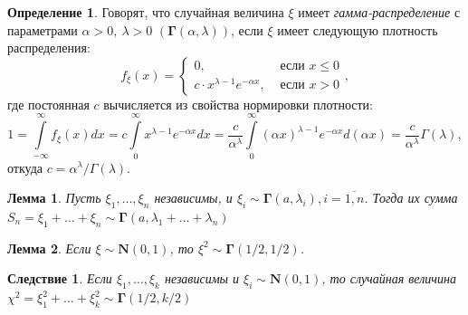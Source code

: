 \documentclass[oneside,final,14pt]{extreport}
\theoremstyle{plain}
\newtheorem*{lem}{Лемма}
\newtheorem*{crlr}{Следствие}
\theoremstyle{definition}
\newtheorem*{defn}{Определение}
\theoremstyle{named}
\begin{document}
\begin{defn}
    Говорят, что случайная величина $\xi$ имеет {\it гамма-распределение} с параметрами $\alpha > 0,~ \lambda > 0$ $(\mathbf{\Gamma}(\alpha, \lambda))$, если $\xi$ имеет следующую плотность распределения:
    \begin{equation*}
        f_{\xi}(x)=\left\{\begin{array}{ll}
        0, & \text { если } x \leqslant 0 \\
        c \cdot x^{\lambda-1} e^{-\alpha x}, & \text { если } x>0
        \end{array}\right.,
    \end{equation*}
    где постоянная $c$ вычисляется из свойства нормировки плотности:
    \begin{equation*}
        1=\int\limits_{-\infty}^{\infty} f_{\xi}(x) d x=c \int\limits_{0}^{\infty} x^{\lambda-1} e^{-\alpha x} d x=\frac{c}{\alpha^{\lambda}} \int\limits_{0}^{\infty}(\alpha x)^{\lambda-1} e^{-\alpha x} d(\alpha x)=\frac{c}{\alpha^{\lambda}} \Gamma(\lambda),
    \end{equation*}
    откуда $c=\alpha^{\lambda} / \Gamma(\lambda)$.
\end{defn}

\begin{lem}
    Пусть $\xi_{1}, \ldots, \xi_{n}$ независимы, и $\xi_i \sim \mathbf{\Gamma}(a, \lambda_i), i=\overline{1,n}$. Тогда их сумма $S_{n}=\xi_{1}+\ldots+\xi_{n} \sim \mathbf{\Gamma}(a, \lambda_1 + \ldots + \lambda_n)$
\end{lem}
\begin{lem}
    Если $\xi \sim \mathbf{N}(0,1)$, то $\xi^2 \sim \mathbf{\Gamma}(1/2, 1/2)$.
\end{lem}
\begin{crlr}
    Если $\xi_{1}, \ldots, \xi_{k}$ независимы и $\xi_i \sim \mathbf{N}(0,1)$, то случайная величина $\chi^{2}=\xi_{1}^{2}+\ldots+\xi_{k}^{2} \sim \mathbf{\Gamma}(1/2, k/2)$
\end{crlr}
\end{document}
